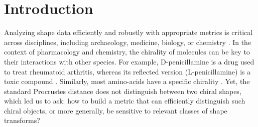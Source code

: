 \documentclass{article}
\newcommand{\1}{\mathbf{1}}
\theoremstyle{definition}
\theoremstyle{remark}
\begin{document}
\section{Introduction}
Analyzing shape data efficiently and robustly with appropriate metrics is critical across disciplines, including archaeology, medicine, biology, or chemistry \cite{dryden2016statistical}. In the context of pharmacology and chemistry, the chirality of molecules can be key to their interactions with other species. For example,  D-penicillamine is a drug used to treat rheumatoid arthritis, whereas its reflected version (L-penicillamine) is a toxic compound \cite{solomons2008organic}. Similarly, most amino-acids have a specific chirality \cite{jamroz2012chirality}. Yet, the standard Procrustes distance \cite{adamo2025depth} does not distinguish between two chiral shapes, which led us to ask: how to build a metric that can efficiently distinguish such chiral objects, or more generally, be sensitive to relevant classes of shape transforms? 
\end{document}
